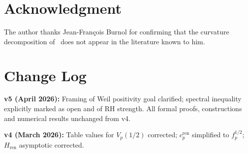 \documentclass[11pt]{article}
\begin{document}
\section*{Acknowledgment}

The author thanks Jean-Fran\c{c}ois Burnol for confirming that the
curvature decomposition of~\cite{paper1} does not appear in the
literature known to him.

\section*{Change Log}
\textbf{v5 (April 2026):}
Framing of Weil positivity goal clarified;
spectral inequality explicitly marked as open and of RH strength.
All formal proofs, constructions and numerical results unchanged from v4.

\textbf{v4 (March 2026):}
Table values for $V_p(1/2)$ corrected; $c_p^{\mathrm{ren}}$ simplified
to $f_p^{1/2}$; $H_{\mathrm{ren}}$ asymptotic corrected.
\end{document}

